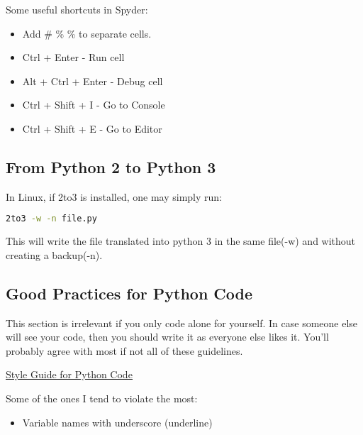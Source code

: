 Some useful shortcuts in Spyder:
\begin{itemize}
    \item Add \# \% \% to separate cells.
    \item Ctrl + Enter - Run cell
    \item Alt + Ctrl + Enter - Debug cell
    \item Ctrl + Shift + I - Go to Console
    \item Ctrl + Shift + E - Go to Editor
\end{itemize}



\subsection{From Python 2 to Python 3}
In Linux, if 2to3 is installed, one may simply run:
\begin{lstlisting}[language=bash]
    2to3 -w -n file.py    
\end{lstlisting}
This will write the file translated into python 3 in the same file(-w) and without creating a backup(-n).


\subsection{Good Practices for Python Code}

This section is irrelevant if you only code alone for yourself. In case someone else will see your code, then you should write it as everyone else likes it. You'll probably agree with most if not all of these guidelines.

\href{https://www.python.org/dev/peps/pep-0008/}{\ul{Style Guide for Python Code}}

Some of the ones I tend to violate the most:
\begin{itemize}
    \item Variable names with underscore (underline)
\end{itemize}

